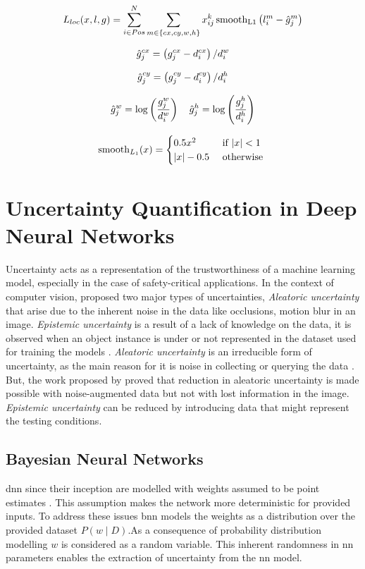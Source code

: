     \begin{equation}
        \setlength{\jot}{10pt}
        \begin{gathered}
            L_{l o c}(x, l, g)=\sum_{i \in P o s}^{N} \sum_{m \in\{c x, c y, w, h\}} x_{i j}^{k} \operatorname{smooth}_{\mathrm{L} 1}\left(l_{i}^{m}-\hat{g}_{j}^{m}\right) \\
            \hat{g}_{j}^{c x}=\left(g_{j}^{c x}-d_{i}^{c x}\right) / d_{i}^{w} \\
            \hat{g}_{j}^{c y}=\left(g_{j}^{c y}-d_{i}^{c y}\right) / d_{i}^{h} \\
            \hat{g}_{j}^{w}=\log \left(\frac{g_{j}^{w}}{d_{i}^{w}}\right) \quad \hat{g}_{j}^{h}=\log \left(\frac{g_{j}^{h}}{d_{i}^{h}}\right) \\
            \operatorname{smooth}_{L_{1}}(x)= \begin{cases}0.5 x^{2} & \text { if }|x|<1 \\ |x|-0.5 & \text { otherwise }\end{cases}
        \end{gathered}
    \end{equation}
    
    \section{Uncertainty Quantification in Deep Neural Networks}
    Uncertainty acts as a representation of the trustworthiness of a machine learning model, especially in the case of safety-critical applications. In the context of computer vision, \citet{Kendall2017} proposed two major types of uncertainties, \textit{Aleatoric uncertainty} that arise due to the inherent noise in the data like occlusions, motion blur in an image. \textit{Epistemic uncertainty} is a result of a lack of knowledge on the data, it is observed when an object instance is under or not represented in the dataset used for training the models \cite{Scheirer2013, Scheirer2014ProbabilityMF}. \textit{Aleatoric uncertainty} is an irreducible form of uncertainty, as the main reason for it is noise in collecting or querying the data \cite{Kendall2017}. But, the work proposed by \citet{Lopes2019ImprovingRW} proved that reduction in aleatoric uncertainty is made possible with noise-augmented data but not with lost information in the image. \textit{Epistemic uncertainty} can be reduced by introducing data that might represent the testing conditions.
    
    \subsection{Bayesian Neural Networks}
    \label{BNN_Intro}
    \acrlong{dnn} since their inception are modelled with weights assumed to be point estimates \cite{Scheirer2014ProbabilityMF, Kendall2017, Blundell2015}. This assumption makes the network more deterministic for provided inputs. To address these issues \acrshort{bnn} models the weights as a distribution over the provided dataset $P(w \mid D)$.As a consequence of probability distribution modelling $w$ is considered as a random variable. This inherent randomness in \acrshort{nn} parameters enables the extraction of uncertainty from the \acrshort{nn} model.
    
